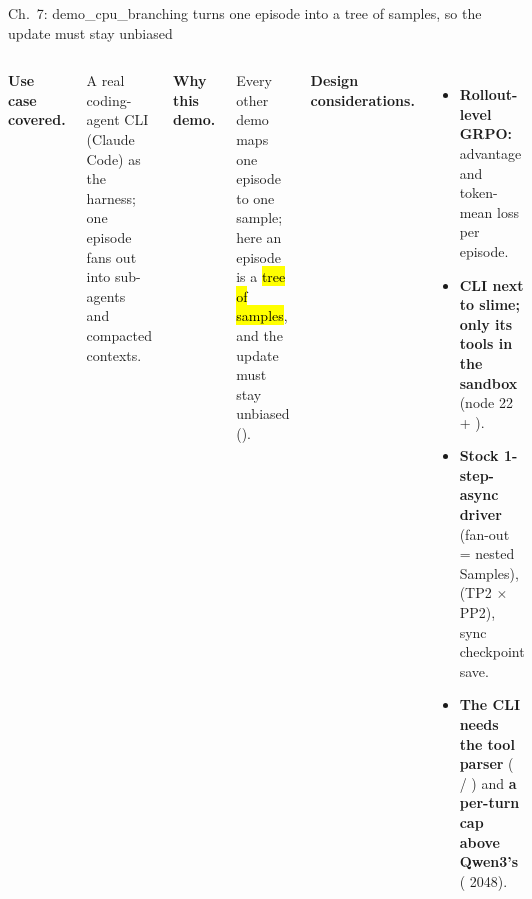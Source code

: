 \begin{frame}{Ch.\ 7: demo\_cpu\_branching turns one episode into a tree of samples, so the update must stay unbiased}
\begin{columns}[T]
{\footnotesize\textbf{\color{awsteal}Use case covered.}\par}
{\scriptsize A real coding-agent CLI (Claude Code) as the harness; one episode fans out into sub-agents and compacted contexts.\par}
\vspace{3mm}
{\footnotesize\textbf{\color{awsteal}Why this demo.}\par}
{\scriptsize Every other demo maps one episode to one sample; here an episode is a \hl{tree of samples}, and the update must stay unbiased ().\par}
{\footnotesize\textbf{\color{awsteal}Design considerations.}\par}
\begin{itemize}\scriptsize\setlength{\itemsep}{1.6mm}
\item \textbf{Rollout-level GRPO:} advantage and token-mean loss per episode.
\item \textbf{CLI next to slime; only its tools in the sandbox} (node 22 + ).
\item \textbf{Stock 1-step-async driver} (fan-out = nested Samples), \textbf{} (TP2 $\times$ PP2), sync checkpoint save.
\item \textbf{The CLI needs the tool parser} ( / ) and \textbf{a per-turn cap above Qwen3's } ( 2048).
\end{itemize}
\end{columns}
\end{frame}

